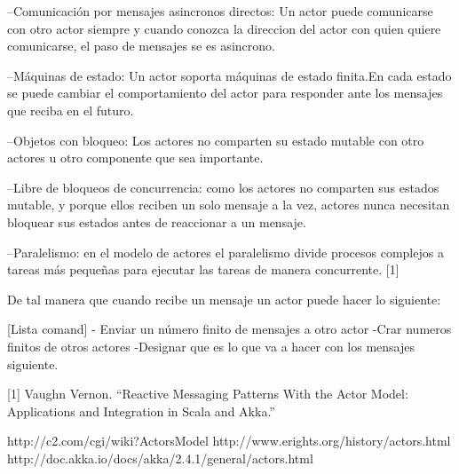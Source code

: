 --Comunicaci\'on por mensajes asincronos directos: Un actor puede
comunicarse con otro actor siempre y cuando conozca la direccion del
actor con quien quiere comunicarse, el paso de mensajes se es
asincrono.

--M\'aquinas de estado: Un actor soporta m\'aquinas de estado
finita.En cada estado se puede cambiar el comportamiento del actor
para responder ante los mensajes que reciba en el futuro.

--Objetos con bloqueo: Los actores no comparten su estado mutable con
otro actores u otro componente que sea importante.

--Libre de bloqueos de concurrencia: como los actores no comparten sus
estados mutable, y porque ellos reciben un solo mensaje a la vez,
actores nunca necesitan bloquear sus estados antes de reaccionar a un
mensaje.

--Paralelismo: en el modelo de actores el paralelismo divide procesos
complejos a tareas m\'as peque\~nas para ejecutar las tareas de manera
concurrente. [1]



De tal manera que cuando recibe un mensaje un actor puede hacer lo
siguiente:

[Lista comand] - Enviar un n\'umero finito de mensajes a otro actor
-Crar numeros finitos de otros actores -Designar que es lo que va a
hacer con los mensajes siguiente.



[1] Vaughn Vernon. “Reactive Messaging Patterns With the Actor Model:
Applications and Integration in Scala and Akka.”

http://c2.com/cgi/wiki?ActorsModel
http://www.erights.org/history/actors.html
http://doc.akka.io/docs/akka/2.4.1/general/actors.html



